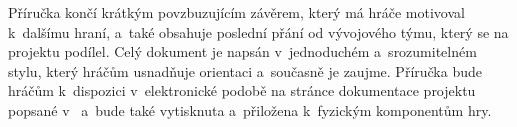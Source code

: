 Příručka končí krátkým povzbuzujícím závěrem, který má hráče motivoval k~dalšímu hraní, a~také obsahuje poslední přání od vývojového týmu, který se na projektu podílel. Celý dokument je napsán v~jednoduchém a~srozumitelném stylu, který hráčům usnadňuje orientaci a~současně je zaujme. Příručka bude hráčům k~dispozici v~elektronické podobě na stránce dokumentace projektu popsané v~ a~bude také vytisknuta a~přiložena k~fyzickým komponentům hry.


